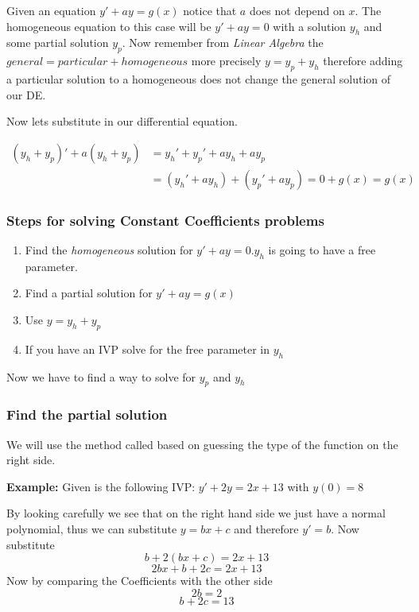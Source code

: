 Given an equation \(y' + ay = g(x)\) notice that \(a\) does not depend on \(x\).
The homogeneous equation to this case will be \(y' + ay = 0\) with a solution \(y_h\) and some
partial solution \(y_p\). Now remember from \emph{Linear Algebra} the \(general = particular + homogeneous\)
more precisely \(y = y_p + y_h\) therefore adding a particular solution to a homogeneous does not change
the general solution of our DE.
\vspace{\baselineskip}

Now lets substitute in our differential equation.

\begin{align*}
(y_h + y_p)' + a(y_h + y_p) &= y_h' + y_p' + ay_h + ay_p\\   
&= (y_h' + ay_h) + (y_p' + ay_p) = 0 + g(x) = g(x) 
\end{align*}

\subsubsection{Steps for solving Constant Coefficients problems}
\begin{enumerate}
    \item Find the \emph{homogeneous} solution for \(y' + ay = 0\).\(y_h\) is going
    to have a free parameter.
    \item Find a partial solution for \(y' + ay = g(x)\)
    \item Use \(y = y_h + y_p\)
    \item If you have an IVP solve for the free parameter in \(y_h\)
\end{enumerate}

Now we have to find a way to solve for \(y_p\) and \(y_h\)

\subsubsection{Find the partial solution}

We will use the method called based on guessing the type of the function on the right side.
\vspace{\baselineskip}

\textbf{Example: }
Given is the following IVP: \(y' + 2y = 2x + 13\) with \(y(0) = 8\)
\vspace{\baselineskip}

By looking carefully we see that on the right hand side we just have a normal polynomial,
thus we can substitute \(y = bx + c\) and therefore \(y' = b\). Now substitute
\[
b + 2(bx + c) = 2x + 13
\]
\[
2bx + b + 2c = 2x + 13
\]
Now by comparing the Coefficients with the other side 
\[2b = 2\]
\[b + 2c = 13\]

